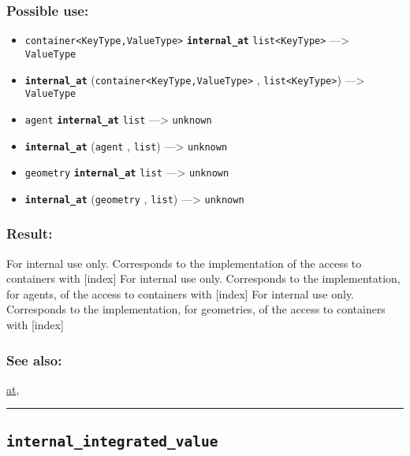 \documentclass[]{book}
\providecommand{\tightlist}{%
  \setlength{\itemsep}{0pt}\setlength{\parskip}{0pt}}
\theoremstyle{definition}
\theoremstyle{definition}
\theoremstyle{definition}
\theoremstyle{remark}
\begin{document}
\subsubsection{Possible use:}\label{possible-use-279}

\begin{itemize}
\tightlist
\item
  \texttt{container\textless{}KeyType,ValueType\textgreater{}}
  \textbf{\texttt{internal\_at}}
  \texttt{list\textless{}KeyType\textgreater{}} ---\textgreater{}
  \texttt{ValueType}
\item
  \textbf{\texttt{internal\_at}}
  (\texttt{container\textless{}KeyType,ValueType\textgreater{}} ,
  \texttt{list\textless{}KeyType\textgreater{}}) ---\textgreater{}
  \texttt{ValueType}
\item
  \texttt{agent} \textbf{\texttt{internal\_at}} \texttt{list}
  ---\textgreater{} \texttt{unknown}
\item
  \textbf{\texttt{internal\_at}} (\texttt{agent} , \texttt{list})
  ---\textgreater{} \texttt{unknown}
\item
  \texttt{geometry} \textbf{\texttt{internal\_at}} \texttt{list}
  ---\textgreater{} \texttt{unknown}
\item
  \textbf{\texttt{internal\_at}} (\texttt{geometry} , \texttt{list})
  ---\textgreater{} \texttt{unknown}
\end{itemize}

\subsubsection{Result:}\label{result-269}

For internal use only. Corresponds to the implementation of the access
to containers with {[}index{]} For internal use only. Corresponds to the
implementation, for agents, of the access to containers with {[}index{]}
For internal use only. Corresponds to the implementation, for
geometries, of the access to containers with {[}index{]}

\subsubsection{See also:}\label{see-also-120}

\href{OperatorsAA\#at}{at},

\begin{center}\rule{0.5\linewidth}{\linethickness}\end{center}

\subsection{\texorpdfstring{\texttt{internal\_integrated\_value}}{internal\_integrated\_value}}\label{internal_integrated_value}
\end{document}
